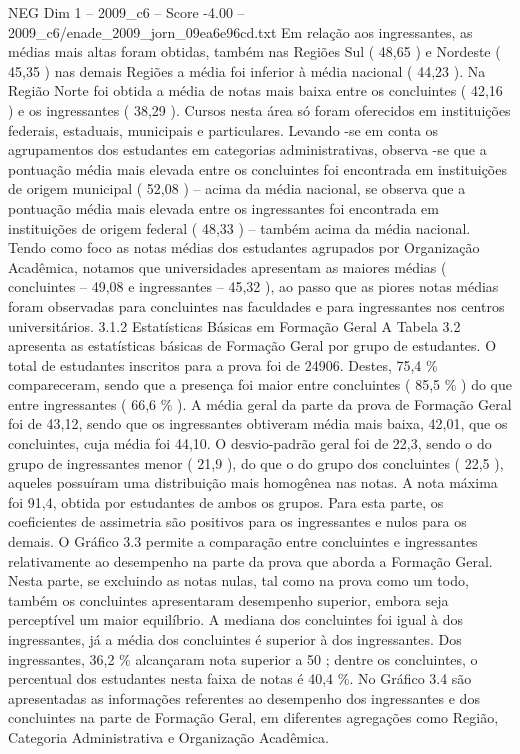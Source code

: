 \begin{textsample}{NEG Dim 1 – 2009\_c6 – Score -4.00 – 2009\_c6/enade\_2009\_jorn\_09ea6e96cd.txt}
Em relação aos ingressantes, as médias mais altas foram obtidas, também nas Regiões Sul ( 48,65 ) e Nordeste ( 45,35 ) nas demais Regiões a média foi inferior à média nacional ( 44,23 ).
Na Região Norte foi obtida a média de notas mais baixa entre os concluintes ( 42,16 ) e os ingressantes ( 38,29 ).
Cursos nesta área só foram oferecidos em instituições federais, estaduais, municipais e particulares.
Levando -se em conta os agrupamentos dos estudantes em categorias administrativas, observa -se que a pontuação média mais elevada entre os concluintes foi encontrada em instituições de origem municipal ( 52,08 ) – acima da média nacional, se observa que a pontuação média mais elevada entre os ingressantes foi encontrada em instituições de origem federal ( 48,33 ) – também acima da média nacional.
Tendo como foco as notas médias dos estudantes agrupados por Organização Acadêmica, notamos que universidades apresentam as maiores médias ( concluintes – 49,08 e ingressantes – 45,32 ), ao passo que as piores notas médias foram observadas para concluintes nas faculdades e para ingressantes nos centros universitários. 3.1.2 Estatísticas Básicas em Formação Geral A Tabela 3.2 apresenta as estatísticas básicas de Formação Geral por grupo de estudantes.
O total de estudantes inscritos para a prova foi de 24906.
Destes, 75,4 \% compareceram, sendo que a presença foi maior entre concluintes ( 85,5 \% ) do que entre ingressantes ( 66,6 \% ).
A média geral da parte da prova de Formação Geral foi de 43,12, sendo que os ingressantes obtiveram média mais baixa, 42,01, que os concluintes, cuja média foi 44,10.
O desvio-padrão geral foi de 22,3, sendo o do grupo de ingressantes menor ( 21,9 ), do que o do grupo dos concluintes ( 22,5 ), aqueles possuíram uma distribuição mais homogênea nas notas.
A nota máxima foi 91,4, obtida por estudantes de ambos os grupos.
Para esta parte, os coeficientes de assimetria são positivos para os ingressantes e nulos para os demais.
O Gráfico 3.3 permite a comparação entre concluintes e ingressantes relativamente ao desempenho na parte da prova que aborda a Formação Geral.
Nesta parte, se excluindo as notas nulas, tal como na prova como um todo, também os concluintes apresentaram desempenho superior, embora seja perceptível um maior equilíbrio.
A mediana dos concluintes foi igual à dos ingressantes, já a média dos concluintes é superior à dos ingressantes.
Dos ingressantes, 36,2 \% alcançaram nota superior a 50 ; dentre os concluintes, o percentual dos estudantes nesta faixa de notas é 40,4 \%.
No Gráfico 3.4 são apresentadas as informações referentes ao desempenho dos ingressantes e dos concluintes na parte de Formação Geral, em diferentes agregações como Região, Categoria Administrativa e Organização Acadêmica.

\end{textsample}
